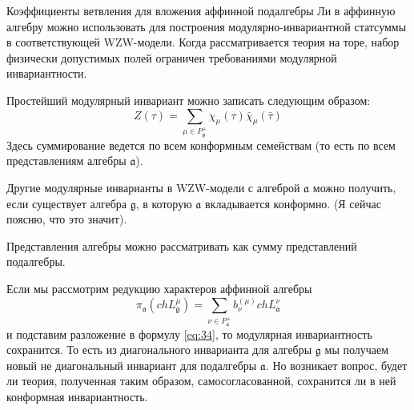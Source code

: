 Коэффициенты ветвления для вложения аффинной подалгебры Ли в аффинную алгебру можно использовать для
построения модулярно-инвариантной статсуммы в соответствующей WZW-модели. Когда рассматривается
теория на торе,  набор физически допустимых полей ограничен требованиями модулярной инвариантности.

Простейший модулярный инвариант можно записать следующим образом:
\begin{equation}
  \label{eq:34}
   Z(\tau)=\sum_{ \mu\in P^{+}_{\mathfrak{g}}} \chi_{\mu}(\tau)\bar \chi_{\mu}(\bar \tau)
\end{equation}
Здесь суммирование ведется по всем конформным семействам (то есть по всем представлениям алгебры
$\mathfrak{a}$).

Другие модулярные инварианты в WZW-модели с алгеброй $\mathfrak{a}$ можно получить, если существует
алгебра $\mathfrak{g}$, в которую $\mathfrak{a}$ вкладывается конформно. (Я сейчас поясню, что это
значит). 

Представления алгебры можно рассматривать как сумму представлений подалгебры. 

Если мы рассмотрим редукцию характеров аффинной алгебры
\begin{equation}
  \label{eq:8}
   \pi_{\mathfrak{a}}(ch L^{\mu}_{\mathfrak{g}})=
  \sum_{\nu\in P^{+}_{\mathfrak{a}}}b^{(\mu)}_{\nu} ch L^{\nu}_{\mathfrak{a}}
\end{equation}
и подставим разложение в формулу \eqref{eq:34}, то модулярная инвариантность сохранится. То есть из
диагонального инварианта для алгебры $\mathfrak{g}$ мы получаем новый не диагональный инвариант для
подалгебры $\mathfrak{a}$. Но возникает вопрос, будет ли теория, полученная таким образом, самосогласованной, сохранится ли в
ней конформная инвариантность.

